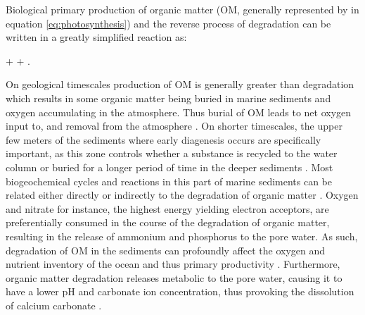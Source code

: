 \documentclass[gmd, manuscript]{copernicus}
\begin{document}
Biological primary production of organic matter (OM, generally represented by  in equation \ref{eq:photosynthesis}) and the reverse process of degradation can be written in a greatly simplified reaction as:
\begin{reaction}
+ \rightleftharpoons {} + .\label{eq:photosynthesis}
\end{reaction}
On geological timescales production of OM is generally greater than degradation which results in some organic matter being buried in marine sediments and oxygen accumulating in the atmosphere. 
Thus burial of OM leads to net oxygen input to, and  removal from the atmosphere \citep{berner_phanerozoic_2004}. 
On shorter timescales, the upper few meters of the sediments where early diagenesis occurs are specifically important, as this zone controls whether a substance is recycled 
to the water column or buried for a longer period of time in the deeper sediments \citep{hensen_benthic_2006}. 
Most biogeochemical cycles and reactions in this part of marine sediments can be related either directly or indirectly to the degradation of organic matter \citep[][]{middelburg_organic_1993, arndt_quantifying_2013}. 
Oxygen and nitrate for instance, the highest energy yielding electron acceptors, are preferentially consumed in the course of the degradation of organic matter, resulting in the release of ammonium and phosphorus to the pore water. 
As such, degradation of OM in the sediments can profoundly affect the oxygen and nutrient inventory of the ocean and thus primary productivity \citep{van_cappellen_benthic_1994, lenton_redfield_2000}. 
Furthermore, organic matter degradation releases metabolic  to the pore water, causing it to have a lower pH and carbonate ion concentration, thus provoking the dissolution of calcium carbonate  \citep{emerson_carbon_1981}.


\end{document}
